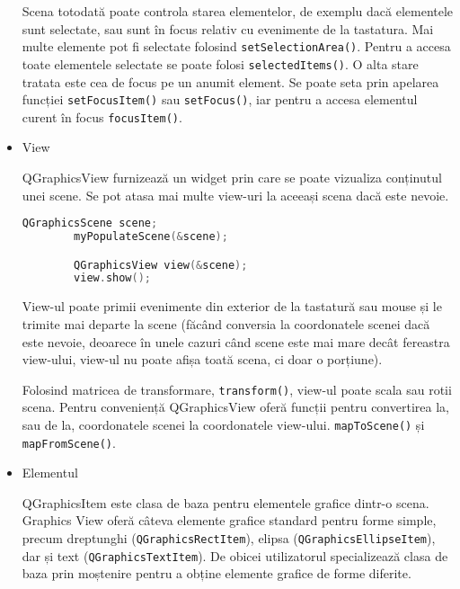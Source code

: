 \begin{itemize}
    Scena totodată poate controla starea elementelor, de exemplu dacă elementele sunt selectate, sau sunt în focus relativ cu 
    evenimente de la tastatura. Mai multe elemente pot fi selectate folosind \verb|setSelectionArea()|. 
    Pentru a accesa toate elementele selectate se poate folosi \verb|selectedItems()|. O alta stare tratata este cea 
    de focus pe un anumit element. Se poate seta prin apelarea funcției \verb|setFocusItem()| sau \verb|setFocus()|, 
    iar pentru a accesa elementul curent în focus \verb|focusItem()|.\newline

    \item View
    
    QGraphicsView furnizează un widget prin care se poate vizualiza conținutul unei scene. Se pot atasa mai multe view-uri la 
    aceeași scena dacă este nevoie. \cite{qt}

    \begin{lstlisting}[language=C++]
        QGraphicsScene scene;
        myPopulateScene(&scene);

        QGraphicsView view(&scene);
        view.show();

    \end{lstlisting}

    View-ul poate primii evenimente din exterior de la tastatură sau mouse și le trimite mai departe la scene 
    (făcând conversia la coordonatele scenei dacă este nevoie, deoarece în unele cazuri când scene este mai mare 
    decât fereastra view-ului, view-ul nu poate afișa toată scena, ci doar o porțiune).\newline
    
    Folosind matricea de transformare, \verb|transform()|, view-ul poate scala sau rotii scena. 
    Pentru conveniență QGraphicsView oferă funcții pentru convertirea la, sau de la, coordonatele scenei la 
    coordonatele view-ului. \verb|mapToScene()| și \verb|mapFromScene()|.\newline

    \item Elementul
    
    QGraphicsItem este clasa de baza pentru elementele grafice dintr-o scena. Graphics View oferă câteva elemente grafice 
    standard pentru forme simple, precum dreptunghi  (\verb|QGraphicsRectItem|), elipsa (\verb|QGraphicsEllipseItem|), dar și text 
    (\verb|QGraphicsTextItem|). De obicei utilizatorul specializează clasa de baza prin moștenire pentru a obține elemente 
    grafice de forme diferite.\newline


\end{itemize}
